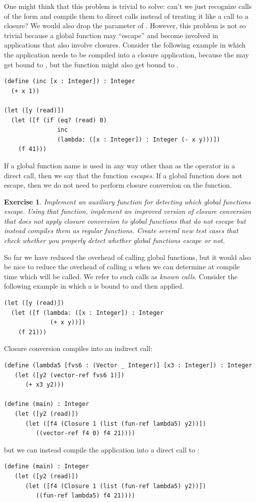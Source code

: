 \documentclass[7x10]{TimesAPriori_MIT}%
\newtheorem{exercise}[theorem]{Exercise}
\begin{document}
One might think that this problem is trivial to solve: can't we just
recognize calls of the form 
and compile them to direct calls  instead of treating it like a call to a closure? We would
also drop the  parameter of .
%
However, this problem is not so trivial because a global function may
``escape'' and become involved in applications that also involve
closures. Consider the following example in which the application
 needs to be compiled into a closure application, because
the  may get bound to , but the 
function might also get bound to .
\begin{lstlisting}
(define (inc [x : Integer]) : Integer
  (+ x 1))

(let ([y (read)])
  (let ([f (if (eq? (read) 0)
               inc
               (lambda: ([x : Integer]) : Integer (- x y)))])
    (f 41)))
\end{lstlisting}
If a global function name is used in any way other than as the
operator in a direct call, then we say that the function
\emph{escapes}. If a global function does not escape, then we do not
need to perform closure conversion on the function.

\begin{exercise}\normalfont
  Implement an auxiliary function for detecting which global
  functions escape. Using that function, implement an improved version
  of closure conversion that does not apply closure conversion to
  global functions that do not escape but instead compiles them as
  regular functions. Create several new test cases that check whether
  you properly detect whether global functions escape or not.
\end{exercise}

So far we have reduced the overhead of calling global functions, but
it would also be nice to reduce the overhead of calling a
 when we can determine at compile time which
 will be called. We refer to such calls as \emph{known
  calls}.  Consider the following example in which a  is
bound to  and then applied.
\begin{lstlisting}
(let ([y (read)])
  (let ([f (lambda: ([x : Integer]) : Integer
             (+ x y))])
    (f 21)))
\end{lstlisting}
Closure conversion compiles  into an indirect call:
\begin{lstlisting}
(define (lambda5 [fvs6 : (Vector _ Integer)] [x3 : Integer]) : Integer
   (let ([y2 (vector-ref fvs6 1)])
      (+ x3 y2)))

(define (main) : Integer
   (let ([y2 (read)])
      (let ([f4 (Closure 1 (list (fun-ref lambda5) y2))])
         ((vector-ref f4 0) f4 21))))
\end{lstlisting}
but we can instead compile the application  into a direct call
to :
\begin{lstlisting}
(define (main) : Integer
   (let ([y2 (read)])
      (let ([f4 (Closure 1 (list (fun-ref lambda5) y2))])
         ((fun-ref lambda5) f4 21))))
\end{lstlisting}
\end{document}
